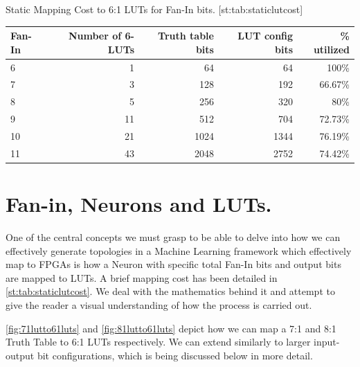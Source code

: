\begin{table}
    \begin{sidecaption}{%
        Static Mapping Cost to 6:1 LUTs for Fan-In bits.
    }[st:tab:staticlutcost]
    \centering
    \begin{threeparttable}
    \renewcommand{\arraystretch}{1.2}
    \begin{tabular}{lrrrr}
        \toprule 
        Fan-In & Number of 6-LUTs & Truth table bits & LUT config bits & \% utilized \\  \midrule

        6 \            &  1  & 64   &     64   & 100\%    \\ 
        7\             &  3  & 128  &     192  & 66.67\%  \\ 
        8\             &  5  & 256  &     320  & 80\%     \\ 
        9\             &  11 & 512  &     704  & 72.73\%  \\ 
        10 \           &  21 & 1024 &     1344 & 76.19\%  \\ 
        11\            &  43 & 2048 &     2752 & 74.42\%  \\ 
        \bottomrule
    \end{tabular}
    \end{threeparttable}
    \end{sidecaption}
\end{table}

\section{Fan-in, Neurons and LUTs.}
One of the central concepts we must grasp to be able to delve into how we can effectively generate topologies in a Machine Learning framework which effectively map to FPGAs is how a Neuron with specific total Fan-In bits and output bits are mapped to LUTs. A brief mapping cost has been detailed in \cref{st:tab:staticlutcost}.
We deal with the mathematics behind it and attempt to give the reader a visual understanding of how the process is carried out.

\cref{fig:71lutto61luts} and \cref{fig:81lutto61luts} depict how we can map a 7:1 and 8:1 Truth Table to 6:1 LUTs respectively. We can extend similarly to larger input-output bit configurations, which is being discussed below in more detail.

